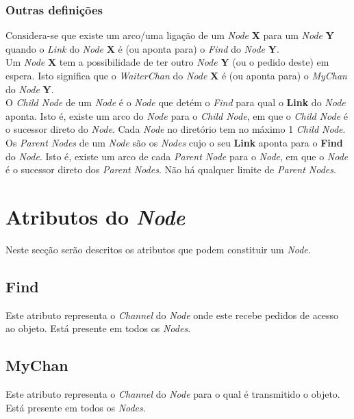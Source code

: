 \subsubsection*{Outras definições}
Considera-se que existe um arco/uma ligação de um \emph{Node} \textbf{X} para um \emph{Node} \textbf{Y} quando o \emph{Link} do 
\emph{Node} \textbf{X}  é (ou aponta para) o \emph{Find} do \emph{Node} \textbf{Y}.
\\

Um \emph{Node} \textbf{X} tem a possibilidade de ter outro \emph{Node} \textbf{Y} (ou o pedido deste) em espera. Isto significa que o \emph{WaiterChan} do 
\emph{Node} \textbf{X} é (ou aponta para) o \emph{MyChan} do \emph{Node} \textbf{Y}.\\

O \emph{Child Node} de um \emph{Node} é o \emph{Node} que detém o \emph{Find} para qual o \textbf{Link} do \emph{Node} aponta. 
Isto é, existe um arco do \emph{Node} para o \emph{Child Node}, em que o \emph{Child Node} é o sucessor direto do \emph{Node}.
Cada \emph{Node} no diretório tem no máximo 1 \emph{Child Node}. \\

Os \emph{Parent Nodes} de um \emph{Node} são os \emph{Nodes} cujo o seu \textbf{Link} aponta para o \textbf{Find} do \emph{Node}.
Isto é, existe um arco de cada \emph{Parent Node} para o \emph{Node}, em que o \emph{Node} é o sucessor direto dos \emph{Parent Nodes}.
Não há qualquer limite de \emph{Parent Nodes}. \\





\section{Atributos do \emph{Node}}
\label{especificacao:atr:section}
Neste secção serão descritos os atributos que podem constituir um \emph{Node}.

\subsection*{Find}
\label{especificacao:atr:Find}
    Este atributo representa o \emph{Channel} do \emph{Node} onde este recebe pedidos de acesso ao objeto.
    Está presente em todos os \emph{Nodes}.

\subsection*{MyChan}
\label{especificacao:atr:mychan}
    Este atributo representa o \emph{Channel} do \emph{Node} para o qual é transmitido o objeto.
    Está presente em todos os \emph{Nodes}.

